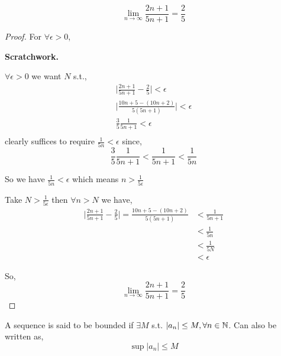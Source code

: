 \begin{eg}
    
    $$ \lim_{n \to \infty} \frac{2n + 1}{5n + 1} = \frac{2}{5} $$ 


\end{eg}
\begin{proof}
    For $\forall \epsilon > 0$,
    \begin{swork}[8cm]
        \textbf{Scratchwork.} 

        \vspace{1em}

        $\forall \epsilon > 0$ we want $N$ s.t., 
        \begin{align*}
        \bigg | \frac{2n + 1}{5n + 1}  - \frac{2}{5} \bigg | < \epsilon\\
        \bigg | \frac{10n + 5 - (10n + 2)}{5(5n + 1)} \bigg | < \epsilon\\
         \frac{3}{5} \frac{1}{5n + 1} < \epsilon\\
        \end{align*}
        clearly suffices to require $\frac{1}{5n} < \epsilon$ since, 
        $$ \frac{3}{5} \frac{1}{5n +1} < \frac{1}{5n + 1} < \frac{1}{5n} $$ 

        So we have $\frac{1}{5n} < \epsilon$ which means $n > \frac{1}{5 \epsilon}$
    \end{swork}


    \vspace{1em}

    Take $N > \frac{1}{5 \epsilon}$ then $\forall n > N$ we have,  
        \begin{align*}
        \bigg | \frac{2n + 1}{5n + 1}  - \frac{2}{5} \bigg | = \frac{10n + 5 - (10n + 2)}{5(5n + 1)} &< \frac{1}{5n + 1} \\
        &< \frac{1}{5n}\\
        &< \frac{1}{5N} \\
        &< \epsilon
        \end{align*}

        So, 
        $$ \lim_{n \to \infty} \frac{2n + 1}{5n + 1} = \frac{2}{5}   $$ 
\end{proof}


\begin{definition}
    A sequence is said to be bounded if $\exists M$ s.t. $|a_n |\le M, \forall n \in \mathbb{N}$. Can also be written as,  
$$ \sup|a_n| \le M $$ 
\end{definition}

